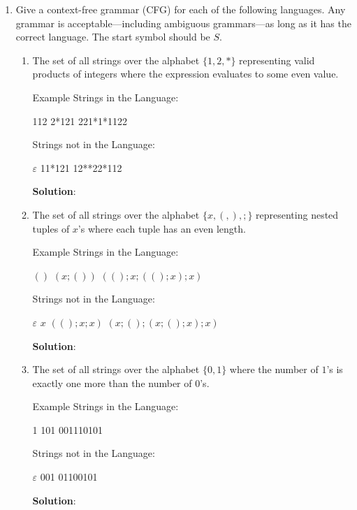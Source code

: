 \documentclass[11pt]{article}
\newcommand\tab[1][1cm]{\hspace*{#1}}
\let\epsilon\varepsilon
\begin{document}
\begin{enumerate}
\item  Give a context-free grammar (CFG) for each of the following languages. Any grammar is acceptable---including ambiguous grammars---as long as it has the correct language. The start symbol should be $S$.
  \begin{enumerate}
  \item The set of all strings over the alphabet $\{1,2,*\}$ representing valid products of integers where the expression evaluates to some even value.

    Example Strings in the Language:
    \begin{center}
      112 \tab \tab 2*121 \tab \tab 221*1*1122
    \end{center}
    Strings not in the Language:
    \begin{center}
      $\epsilon$ \tab \tab 11*121  \tab \tab 12**22*112
    \end{center}
    
    \textbf{Solution}:
    
  \item The set of all strings over the alphabet $\{x,(,),;\}$ representing nested tuples of $x$'s where each tuple has an even length.

    Example Strings in the Language:
    \begin{center}
      $()$ \tab \tab $(x;())$ \tab \tab $((); x; ((); x); x)$
    \end{center}
    Strings not in the Language:
    \begin{center}
      $\epsilon$ \tab \tab $x$ \tab \tab $((); x; x)$  \tab \tab $(x; (); (x; (); x); x)$
    \end{center}
    
    \textbf{Solution}:
    
  \item  The set of all strings over the alphabet $\{0, 1\}$ where the number of $1$'s is exactly one more than the number of $0$'s.

    Example Strings in the Language:
    \begin{center}
      1 \tab \tab 101  \tab \tab 001110101
    \end{center}
    Strings not in the Language: 
    \begin{center}
      $\epsilon$ \tab \tab 001 \tab \tab 01100101
    \end{center}
    
    \textbf{Solution}:
    

\end{enumerate}
\end{enumerate}
\end{document}
